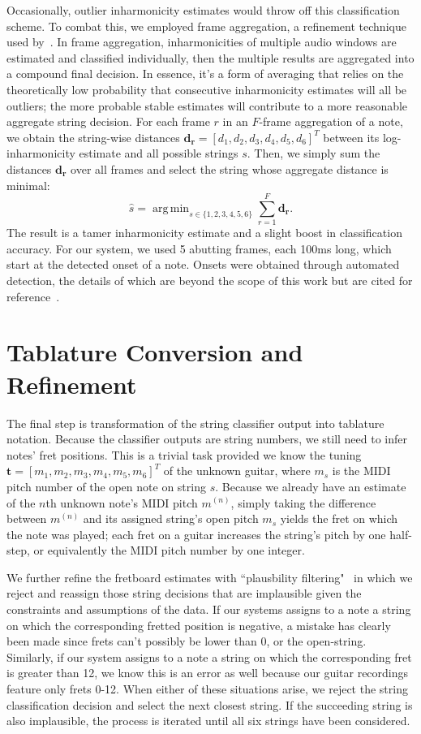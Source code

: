 \documentclass[12pt]{cmuthesis}
\DeclareMathOperator*{\argmin}{arg\,min}
\begin{document}
Occasionally, outlier inharmonicity estimates would throw off this classification scheme. To combat this, we employed frame aggregation, a refinement technique used by~\cite{abesser2012}. In frame aggregation, inharmonicities of multiple audio windows are estimated and classified individually, then the multiple results are aggregated into a compound final decision. In essence, it's a form of averaging that relies on the theoretically low probability that consecutive inharmonicity estimates will all be outliers; the more probable stable estimates will contribute to a more reasonable aggregate string decision. For each frame $r$ in an $F$-frame aggregation of a note, we obtain the string-wise distances $\mathbf{d_r} = [d_1,d_2,d_3,d_4,d_5,d_6]^T$ between its log-inharmonicity estimate and all possible strings $s$. Then, we simply sum the distances $\mathbf{d_r}$ over all frames and select the string whose aggregate distance is minimal:
\begin{equation}
\hat{s} = \argmin_{s\in\{1,2,3,4,5,6\}}\sum_{r=1}^{F} \mathbf{d_r}.
\end{equation}
The result is a tamer inharmonicity estimate and a slight boost in classification accuracy. For our system, we used 5 abutting frames, each 100ms long, which start at the detected onset of a note. Onsets were obtained through automated detection, the details of which are beyond the scope of this work but are cited for reference~\cite{bello2005,dixon2006}.

\section{Tablature Conversion and Refinement}
The final step is transformation of the string classifier output into tablature notation. Because the classifier outputs are string numbers, we still need to infer notes' fret positions. This is a trivial task provided we know the tuning $\mathbf{t} = [m_1, m_2, m_3, m_4, m_5, m_6]^T$ of the unknown guitar, where $m_s$ is the MIDI pitch number of the open note on string $s$. Because we already have an estimate of the $n$th unknown note's MIDI pitch $m^{(n)}$, simply taking the difference between $m^{(n)}$ and its assigned string's open pitch $m_s$ yields the fret on which the note was played; each fret on a guitar increases the string's pitch by one half-step, or equivalently the MIDI pitch number by one integer.

We further refine the fretboard estimates with ``plausbility filtering"~\cite{abesser2012} in which we reject and reassign those string decisions that are implausible given the constraints and assumptions of the data. If our systems assigns to a note a string on which the corresponding fretted position is negative, a mistake has clearly been made since frets can't possibly be lower than 0, or the open-string. Similarly, if our system assigns to a note a string on which the corresponding fret is greater than 12, we know this is an error as well because our guitar recordings feature only frets 0-12. When either of these situations arise, we reject the string classification decision and select the next closest string. If the succeeding string is also implausible, the process is iterated until all six strings have been considered.
\end{document}
